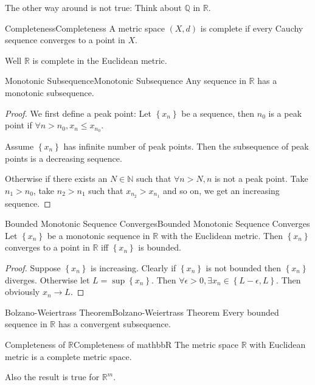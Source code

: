 \documentclass[../main.tex]{subfiles}
\begin{document}
The other way around is not true: Think about $\mathbb{Q}$ in $\mathbb{R}$.

\begin{definition}{Completeness}{Completeness}
A metric space $(X,d)$ is complete if every Cauchy sequence converges to a point in $X$.
\end{definition}

Well $\mathbb{R}$ is complete in the Euclidean metric.

\begin{lemma}{Monotonic Subsequence}{Monotonic Subsequence}
Any sequence in $\mathbb{R}$ has a monotonic subsequence.
\end{lemma}
\begin{proof}
We first define a peak point: Let $\left\{ x_n \right\}$ be a sequence, then $n_0$ is a peak point if $\forall n>n_0,x_n \leq x_{n_0}$.

Assume $\left\{ x_n \right\}$ has infinite number of peak points. Then the subsequence of peak points is a decreasing sequence.

Otherwise if there exists an $N\in \mathbb{N}$ such that $\forall n> N,n$ is not a peak point. Take $n_1>n_0$, take $n_2>n_1$ such that $x_{n_2}>x_{n_1}$ and so on, we get an increasing sequence.
\end{proof}

\begin{proposition}{Bounded Monotonic Sequence Converges}{Bounded Monotonic Sequence Converges}
Let $\left\{ x_n \right\}$ be a monotonic sequence in $\mathbb{R}$ with the Euclidean metric. Then $\left\{ x_n \right\}$ converges to a point in $\mathbb{R}$ iff $\left\{ x_n \right\}$ is bounded.
\end{proposition}
\begin{proof}
Suppose $\left\{ x_n \right\}$ is increasing. Clearly if $\left\{ x_n \right\}$ is not bounded then $\left\{ x_n \right\}$ diverges. Otherwise let $L = \sup \left\{ x_n \right\}$. Then  $\forall \epsilon>0 ,\exists x_n \in \left\{ L-\epsilon, L \right\}$. Then obviously $x_n \rightarrow L$.
\end{proof}

\begin{theorem}{Bolzano-Weiertrass Theorem}{Bolzano-Weiertrass Theorem}
Every bounded sequence in $\mathbb{R}$ has a convergent subsequence.
\end{theorem}

\begin{corollary}{Completeness of $\mathbb{R}$}{Completeness of mathbbR}
The metric space $\mathbb{R}$ with Euclidean metric is a complete metric space.

Also the result is true for $\mathbb{R}^m$.
\end{corollary}
\end{document}
